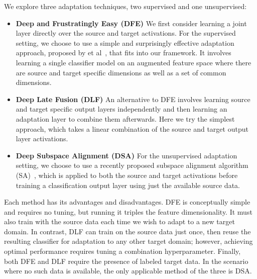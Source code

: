We explore three adaptation techniques, two supervised and one unsupervised:
\begin{itemize}
  \item \textbf{Deep and Frustratingly Easy (DFE)}
    We first consider learning a joint layer directly over the source and target
    activations. For the supervised setting, we choose to use a simple and
    surprisingly effective adaptation approach, proposed by \daume
    et al~\cite{daume}, that fits into our framework. It involves learning a
    single classifier model on an augmented feature space where there are source
    and target specific dimensions as well as a set of common dimensions.

  \item \textbf{Deep Late Fusion (DLF)}
    An alternative to DFE involves learning source and target specific
    output layers independently and then learning an adaptation layer to
    combine them afterwards. Here we try the simplest approach, which takes a linear combination of the source
    and target output layer activations.

  \item \textbf{Deep Subspace Alignment (DSA)}
    For the unsupervised adaptation setting, we choose to use a recently
    proposed subspace alignment algorithm (SA)~\cite{sa}, which is applied to
    both the source and target activations before training a classification
    output layer using just the available source data.

\end{itemize}

Each method has its advantages and disadvantages. DFE is conceptually simple and
requires no tuning, but running it triples the feature dimensionality. It must
also train with the source data each time we wish to adapt to a new target
domain. In contrast, DLF can train on the source data just once, then reuse the
resulting classifier for adaptation to any other target domain; however,
achieving optimal performance requires tuning a combination hyperparameter.
Finally, both DFE and DLF require the presence of labeled target data. In the
scenario where no such data is available, the only applicable method of the
three is DSA.

